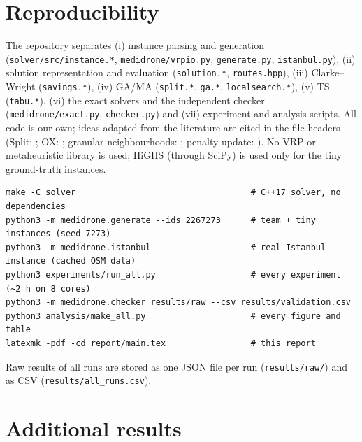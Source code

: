 \section{Reproducibility}\label{app:repro}
The repository separates (i) instance parsing and generation (\texttt{solver/src/instance.*},
\texttt{medidrone/vrpio.py}, \texttt{generate.py}, \texttt{istanbul.py}), (ii) solution representation and
evaluation (\texttt{solution.*}, \texttt{routes.hpp}), (iii) Clarke--Wright (\texttt{savings.*}), (iv) GA/MA
(\texttt{split.*}, \texttt{ga.*}, \texttt{localsearch.*}), (v) TS (\texttt{tabu.*}), (vi) the exact solvers and the
independent checker (\texttt{medidrone/exact.py}, \texttt{checker.py}) and (vii) experiment and analysis scripts.
All code is our own; ideas adapted from the literature are cited in the file headers (Split: \citep{prins2004simple,vidal2016split};
OX: \citep{davis1985applying}; granular neighbourhoods: \citep{toth2003granular}; penalty update: \citep{gendreau1994tabu,cordeau2001unified}).
No VRP or metaheuristic library is used; HiGHS (through SciPy) is used only for the tiny ground-truth instances.
\begin{verbatim}
make -C solver                                   # C++17 solver, no dependencies
python3 -m medidrone.generate --ids 2267273      # team + tiny instances (seed 7273)
python3 -m medidrone.istanbul                    # real Istanbul instance (cached OSM data)
python3 experiments/run_all.py                   # every experiment (~2 h on 8 cores)
python3 -m medidrone.checker results/raw --csv results/validation.csv
python3 analysis/make_all.py                     # every figure and table
latexmk -pdf -cd report/main.tex                 # this report
\end{verbatim}
Raw results of all runs are stored as one JSON file per run (\texttt{results/raw/}) and as CSV
(\texttt{results/all\_runs.csv}).

\section{Additional results}\label{app:extra}

